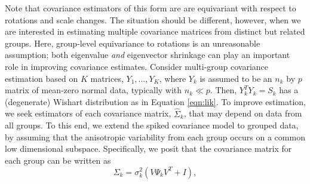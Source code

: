\documentclass{statsoc}
\begin{document}
Note that covariance estimators of this form are are equivariant with
respect to rotations and scale changes.  The situation should be
different, however, when we are interested in estimating multiple
covariance matrices from distinct but related groups.  Here,
group-level equivariance to rotations is an unreasonable assumption;
both eigenvalue \emph{and} eigenvector shrinkage can play an important
role in improving covariance estimates.  Consider multi-group
covariance estimation based on $K$ matrices, $Y_1, ..., Y_K$, where
$Y_k$ is assumed to be an $n_k$ by $p$ matrix of mean-zero normal
data, typically with $n_k \ll p$.  Then, $Y_k^TY_k = S_k$ has a
(degenerate) Wishart distribution as in Equation \ref{eqn:lik}.  To
improve estimation, we seek estimators of each covariance matrix,
$\hat{\Sigma}_k$, that may depend on data from all groups.  To this
end, we extend the spiked covariance model to grouped data, by
assuming that the anisotropic variability from each group occurs on a
common low dimensional subspace.  Specifically, we posit that the
covariance matrix for each group can be written as
\begin{equation}
\Sigma_k = \sigma^2_k(V\Psi_kV^T + I),
\label{eqn:sspsi}
\end{equation}



\end{document}
